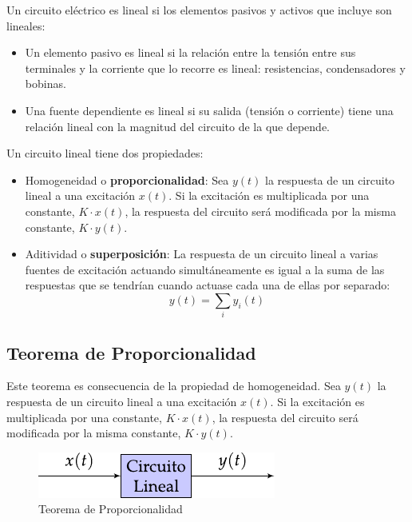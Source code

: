 Un circuito eléctrico es lineal si los elementos pasivos y activos que
incluye son lineales:
\begin{itemize}
\item Un elemento pasivo es lineal si la relación entre la tensión
  entre sus terminales y la corriente que lo recorre es lineal:
  resistencias, condensadores y bobinas.
\item Una fuente dependiente es lineal si su salida (tensión o
  corriente) tiene una relación lineal con la magnitud del circuito de
  la que depende.
\end{itemize}
Un circuito lineal tiene dos propiedades:
\begin{itemize}
\item Homogeneidad o \textbf{proporcionalidad}: Sea $y(t)$ la
  respuesta de un circuito lineal a una excitación $x(t)$. Si la
  excitación es multiplicada por una constante, $K\cdot x(t)$, la
  respuesta del circuito será modificada por la misma constante,
  $K \cdot y(t)$.
\item Aditividad o \textbf{superposición}: La respuesta de un circuito
  lineal a varias fuentes de excitación actuando simultáneamente es
  igual a la suma de las respuestas que se tendrían cuando actuase
  cada una de ellas por separado:
  \begin{equation*}
    y(t)=\sum_i y_i(t)
  \end{equation*}
\end{itemize}

\subsection{Teorema de Proporcionalidad}
\label{sec:proporcionalidad}

Este teorema es consecuencia de la propiedad de homogeneidad. Sea $y(t)$ la respuesta de un circuito lineal a una excitación $x(t)$.  Si la excitación es multiplicada por una constante, $K \cdot x(t)$, la respuesta del circuito será modificada por la misma constante, $K \cdot y(t)$.

\begin{figure}[H]
  \centering
  \includegraphics{../figs/proporcionalidad.pdf}
  \caption{Teorema de Proporcionalidad}
  \label{fig:superposicion_cc}
\end{figure}

